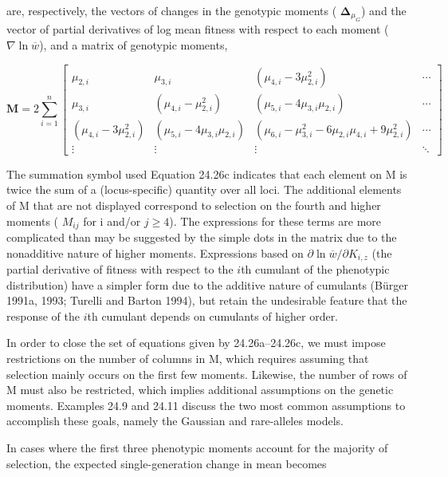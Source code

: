 \documentclass{article}
\begin{document}
are, respectively, the vectors of changes in the genotypic moments ( $ \mathbf{\Delta}_{\mu_G} $) and the vector of partial derivatives of log mean fitness with respect to each moment ( $ \nabla \ln \overline{w} $), and a matrix of genotypic moments,

\begin{equation}
\mathbf{M}=2\sum_{i=1}^{n}\left[\begin{array}{cccc}\mu_{2,i}&\mu_{3,i}&(\mu_{4,i}-3\mu_{2,i}^{2})&\cdots\\ \mu_{3,i}&(\mu_{4,i}-\mu_{2,i}^{2})&(\mu_{5,i}-4\mu_{3,i}\mu_{2,i})&\cdots\\ (\mu_{4,i}-3\mu_{2,i}^{2})&(\mu_{5,i}-4\mu_{3,i}\mu_{2,i})&(\mu_{6,i}-\mu_{3,i}^{2}-6\mu_{2,i}\mu_{4,i}+9\mu_{2,i}^{2})&\cdots\\ \vdots&\vdots&\vdots&\ddots\end{array}\right]
\tag{24.26c}
\label{eq:24_26c}
\end{equation}

The summation symbol used Equation 24.26c indicates that each element on M is twice the sum of a (locus-specific) quantity over all loci. The additional elements of M that are not displayed correspond to selection on the fourth and higher moments ( $ M_{ij} $ for i and/or  $ j \geq 4 $). The expressions for these terms are more complicated than may be suggested by the simple dots in the matrix due to the nonadditive nature of higher moments. Expressions based on  $ \partial \ln \overline{w} / \partial K_{i,z} $ (the partial derivative of fitness with respect to the  $ i $th cumulant of the phenotypic distribution) have a simpler form due to the additive nature of cumulants (Bürger 1991a, 1993; Turelli and Barton 1994), but retain the undesirable feature that the response of the  $ i $th cumulant depends on cumulants of higher order.

In order to close the set of equations given by 24.26a–24.26c, we must impose restrictions on the number of columns in M, which requires assuming that selection mainly occurs on the first few moments. Likewise, the number of rows of M must also be restricted, which implies additional assumptions on the genetic moments. Examples 24.9 and 24.11 discuss the two most common assumptions to accomplish these goals, namely the Gaussian and rare-alleles models.

In cases where the first three phenotypic moments account for the majority of selection, the expected single-generation change in mean becomes
\end{document}
